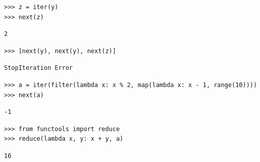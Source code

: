\begin{blocksection}
\begin{lstlisting}
>>> z = iter(y) 
>>> next(z)
\end{lstlisting}
\begin{solution}[0.2in]
\begin{lstlisting}
2
\end{lstlisting}
\end{solution}

\begin{lstlisting}
>>> [next(y), next(y), next(z)]
\end{lstlisting}
\begin{solution}[0.2in]
\begin{lstlisting}
StopIteration Error
\end{lstlisting}
\end{solution}

\begin{lstlisting}
>>> a = iter(filter(lambda x: x % 2, map(lambda x: x - 1, range(10))))
>>> next(a)
\end{lstlisting}
\begin{solution}[0.2in]
\begin{lstlisting}
-1
\end{lstlisting}
\end{solution}

\begin{lstlisting}
>>> from functools import reduce
>>> reduce(lambda x, y: x + y, a)
\end{lstlisting}
\begin{solution}[0.2in]
\begin{lstlisting}
16
\end{lstlisting}
\end{solution}

\end{blocksection}
